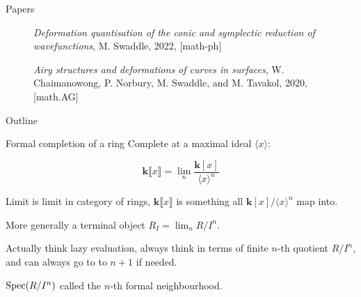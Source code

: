     
    \begin{frame}{Papers}
    \begin{figure}[t]
        \begin{minipage}{0.12\textwidth}    
        \end{minipage} 
        \hfill
        \begin{minipage}{0.85\textwidth} 
        \raggedright
        \emph{Deformation quantisation of the conic and symplectic reduction of wavefunctions}, 
        M. Swaddle, 2022, {\color{pink}{\tt arXiv:2206.04848}} [math-ph] 
        \end{minipage}
    \end{figure}
    
    \begin{figure}[b]
        \begin{minipage}{0.12\textwidth}    
        \end{minipage} 
        \hfill 
        \begin{minipage}{0.85\textwidth}
        \raggedright
        \emph{Airy structures and deformations of curves in surfaces}, W. Chaimanowong, P. Norbury, M. Swaddle, and M. Tavakol, 2020, {\color{pink}{\tt 	arXiv:2012.00254}} [math.AG]
        \end{minipage}
        \end{figure}
    \end{frame}

    
    \begin{frame}{Outline}
    \tableofcontents
    \end{frame}

    \frame{\sectionpage}

    \begin{frame}{Formal completion of a ring}
    Complete at a maximal ideal \( \langle x \rangle \):
    \begin{ex} \[ \mathbf{k} \lBrack x \rBrack   = \lim_{n}  \frac{\mathbf{k}[x]}{\langle x \rangle^n} \]
    \end{ex}
    Limit is limit in category of rings, \( \mathbf{k}\lBrack x \rBrack \) is something all \( \mathbf{k}[x] / \langle x \rangle^n\) map into.
    
    More generally a terminal object \(R_I = \lim_n R/I^n\). 
    
    Actually think lazy evaluation, always think in terms of finite \(n\)-th quotient \(R/I^n\), and can always go to to \(n+1\) if needed.
    
    \begin{defn}\( \mathrm{Spec}( R/I^n)\) called the \(n\)-th formal neighbourhood.
    \end{defn} 
    \end{frame}
    
